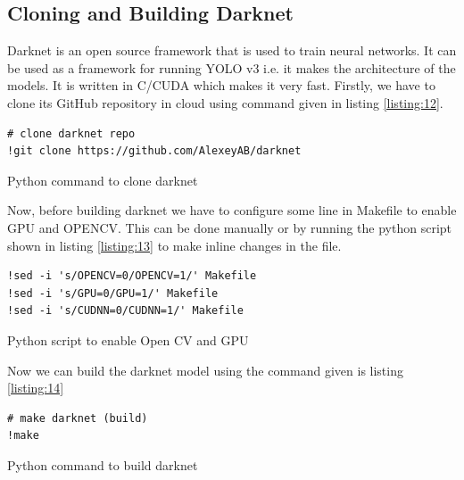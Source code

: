 \subsection{Cloning and Building Darknet}
Darknet is an open source framework that is used to train neural networks. It can be used as a framework for running YOLO v3 i.e. it makes the architecture of the models. It is written in C/CUDA which makes it very fast. Firstly, we have to clone its GitHub repository in cloud using command given in listing \ref{listing:12}.
\begin{longlisting}
\begin{verbatim}
# clone darknet repo
!git clone https://github.com/AlexeyAB/darknet
\end{verbatim}
\caption{Python command to clone darknet}
\label{listing:12}
\end{longlisting}
Now, before building darknet we have to configure some line in Makefile to enable GPU and OPENCV. This can be done manually or by running the python script shown in listing \ref{listing:13} to make inline changes in the file.
\begin{longlisting}
\begin{verbatim}
!sed -i 's/OPENCV=0/OPENCV=1/' Makefile
!sed -i 's/GPU=0/GPU=1/' Makefile
!sed -i 's/CUDNN=0/CUDNN=1/' Makefile
\end{verbatim}
\caption{Python script to enable Open CV and GPU}
\label{listing:13}
\end{longlisting}
Now we can build the darknet model using the command given is listing \ref{listing:14}
\begin{longlisting}
\begin{verbatim}
# make darknet (build)
!make
\end{verbatim}
\caption{Python command to build darknet}
\label{listing:14}
\end{longlisting}

